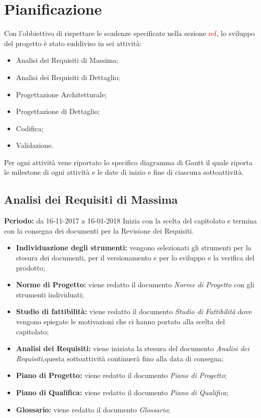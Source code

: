 \section{Pianificazione}
 
Con l'obbiettivo di rispettare le scadenze specificate nella sezione \textcolor{red}{ref}, lo sviluppo del progetto è stato suddiviso in sei attività:
 
\begin{itemize}
 
	\item Analisi dei Requisiti di Massima;
 
	\item Analisi dei Requisiti di Dettaglio;
 
	\item Progettazione Architetturale;
 
	\item Progettazione di Dettaglio;
 
	\item Codifica;
 
	\item Validazione.
 
\end{itemize}
 
Per ogni attività vene riportato lo specifico diagramma di Gantt il quale riporta le milestone di ogni attività e le date di inizio e fine di ciascuna sottoattività.
 

\subsection{Analisi dei Requisiti di Massima}
\textbf{Periodo:} da 16-11-2017 a 16-01-2018\Spazio
Inizia con la scelta del capitolato e termina con la consegna dei documenti per la Revisione dei Requisiti.
\begin{itemize}
	\item \textbf{Individuazione degli strumenti:} vengono selezionati gli strumenti per la stesura dei documenti, per il versionamento e per lo sviluppo e la verifica del prodotto;
	\item \textbf{Norme di Progetto:} viene redatto il documento \emph{Norme di Progetto} con gli strumenti individuati;  
	\item \textbf{Studio di fattibilità:} viene redatto il documento \emph{Studio di Fattibilità} dove vengono spiegate le motivazioni che ci hanno portato alla scelta del capitolato;
	\item \textbf{Analisi dei Requisiti:} viene iniziata la stesura del documento \emph{Analisi dei Requisiti},questa sottoattività continuerà fino alla data di consegna;
	\item \textbf{Piano di Progetto:} viene redatto il documento \emph{Piano di Progetto}; 
	\item \textbf{Piano di Qualifica:} viene redatto il documento \emph{Piano di Qualifica};
	\item \textbf{Glossario:} viene redatto il documento \emph{Glossario};
\end{itemize}
